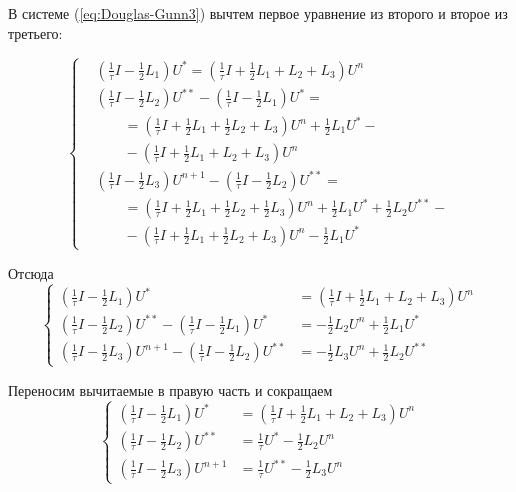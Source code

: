 \documentclass[a4paper,12pt]{article}
\begin{document}
В системе (\ref{eq:Douglas-Gunn3}) вычтем первое уравнение из второго и второе из третьего:

\begin{equation*}
  \begin{cases}
      &\left( \frac{1}{\tau} I - \frac{1}{2} L_1 \right) U^{*} =
      \left( \frac{1}{\tau} I + \frac{1}{2} L_1 +  L_2 + L_3 \right) U^n \\
      &\left( \frac{1}{\tau} I - \frac{1}{2} L_2 \right) U^{**} - 
      \left( \frac{1}{\tau} I - \frac{1}{2} L_1 \right) U^{*} = \\
      & \qquad = \left( \frac{1}{\tau} I + \frac{1}{2} L_1 + \frac{1}{2} L_2 + L_3 \right) U^n + \frac{1}{2} L_1 U^{*} - \\
      & \qquad - \left( \frac{1}{\tau} I + \frac{1}{2} L_1 +  L_2 + L_3 \right) U^n \\
      &\left( \frac{1}{\tau} I - \frac{1}{2} L_3 \right) U^{n+1} -
      \left( \frac{1}{\tau} I - \frac{1}{2} L_2 \right) U^{**} = \\
      & \qquad = \left( \frac{1}{\tau} I + \frac{1}{2} L_1 + \frac{1}{2} L_2 + \frac{1}{2} L_3 \right) U^n + \frac{1}{2} L_1 U^{*}   + \frac{1}{2} L_2 U^{**} - \\
      & \qquad - \left( \frac{1}{\tau} I + \frac{1}{2} L_1 + \frac{1}{2} L_2 + L_3 \right) U^n - \frac{1}{2} L_1 U^{*}
  \end{cases}
\end{equation*}

Отсюда
\begin{equation*}
  \begin{cases}
      \left( \frac{1}{\tau} I - \frac{1}{2} L_1 \right) U^{*} &=
      \left( \frac{1}{\tau} I + \frac{1}{2} L_1 +  L_2 + L_3 \right) U^n \\
      \left( \frac{1}{\tau} I - \frac{1}{2} L_2 \right) U^{**} -
      \left( \frac{1}{\tau} I - \frac{1}{2} L_1 \right) U^{*} &= - \frac{1}{2} L_2 U^n + \frac{1}{2} L_1 U^{*} \\
      \left( \frac{1}{\tau} I - \frac{1}{2} L_3 \right) U^{n+1} - 
      \left( \frac{1}{\tau} I - \frac{1}{2} L_2 \right) U^{**} &= - \frac{1}{2} L_3 U^n + \frac{1}{2} L_2 U^{**}
  \end{cases}
\end{equation*}

Переносим вычитаемые в правую часть и сокращаем
\begin{equation*}
  \begin{cases}
      \left( \frac{1}{\tau} I - \frac{1}{2} L_1 \right) U^{*} &=
      \left( \frac{1}{\tau} I + \frac{1}{2} L_1 +  L_2 + L_3 \right) U^n \\
      \left( \frac{1}{\tau} I - \frac{1}{2} L_2 \right) U^{**} & =
      \frac{1}{\tau} U^{*} - \frac{1}{2} L_2 U^n \\
      \left( \frac{1}{\tau} I - \frac{1}{2} L_3 \right) U^{n+1} & = 
      \frac{1}{\tau} U^{**} - \frac{1}{2} L_3 U^n
  \end{cases}
\end{equation*}
\end{document}
